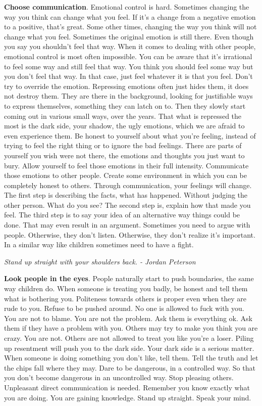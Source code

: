 \documentclass[a4paper,hidelinks]{article}
\begin{document}
\textbf{Choose communication}.
Emotional control is hard.
Sometimes changing the way you think can change what you feel.
If it's a change from a negative emotion to a positive, that's great.
Some other times, changing the way you think will not change what you feel.
Sometimes the original emotion is still there.
Even though you say you shouldn't feel that way.
When it comes to dealing with other people, emotional control is most often impossible.
You can be aware that it's irrational to feel some way and still feel that way.
You think you should feel some way but you don't feel that way.
In that case, just feel whatever it is that you feel.
Don't try to override the emotion.
Repressing emotions often just hides them, it does not destroy them.
They are there in the background, looking for justifiable ways to express themselves, something they can latch on to.
Then they slowly start coming out in various small ways, over the years.
That what is repressed the most is the dark side, your shadow, the ugly emotions, which we are afraid to even experience them.
Be honest to yourself about what you're feeling, instead of trying to feel the right thing or to ignore the bad feelings.
There are parts of yourself you wish were not there, the emotions and thoughts you just want to bury.
Allow yourself to feel those emotions in their full intensity.
Communicate those emotions to other people.
Create some environment in which you can be completely honest to others.
Through communication, your feelings will change.
The first step is describing the facts, what has happened.
Without judging the other person.
What do you see?
The second step is, explain how that made you feel.
The third step is to say your idea of an alternative way things could be done.
That may even result in an argument.
Sometimes you need to argue with people.
Otherwise, they don't listen.
Otherwise, they don't realize it's important.
In a similar way like children sometimes need to have a fight.

\newpage

\begin{center}
\textit{Stand up straight with your shoulders back. - Jordan Peterson}
\end{center}

\textbf{Look people in the eyes}.
People naturally start to push boundaries, the same way children do.
When someone is treating you badly, be honest and tell them what is bothering you.
Politeness towards others is proper even when they are rude to you.
Refuse to be pushed around.
No one is allowed to fuck with you.
You are not to blame.
You are not the problem.
Ask them is everything ok.
Ask them if they have a problem with you.
Others may try to make you think you are crazy.
You are not.
Others are not allowed to treat you like you're a loser.
Piling up resentment will push you to the dark side.
Your dark side is a serious matter.
When someone is doing something you don't like, tell them.
Tell the truth and let the chips fall where they may.
Dare to be dangerous, in a controlled way.
So that you don't become dangerous in an uncontrolled way.
Stop pleasing others.
Unpleasant direct communication is needed.
Remember you know exactly what you are doing.
You are gaining knowledge.
Stand up straight.
Speak your mind.
\end{document}
